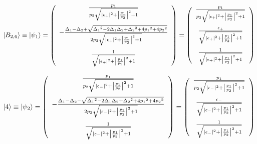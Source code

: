 \begin{equation}
     \ket{B_{2,6}}\equiv\ket{\psi_1}=\left(
        \begin{array}{c}
       \frac{{p_1}}{{p_2}\sqrt{
       |\epsilon_{+}|^2
       +\left|\frac{{p_1}}{{p_2}}\right|^2+1}}\\[20pt]
       -\frac{{\Delta_1}-{\Delta_2}+\sqrt{{\Delta_1}^2-2{\Delta_1}{\Delta_2}+{\Delta_2}^2+4{p_1}^2+4{p_2}^2}}{2{p_2}\sqrt{
       |\epsilon_{+}|^2
       +\left|\frac{{p_1}}{{p_2}}\right|^2+1}}\\[20pt]
       \frac{1}{\sqrt{
       |\epsilon_{+}|^2
       +\left|\frac{{p_1}}{{p_2}}\right|^2+1}}
        \end{array}
        \right)
        =\left(
        \begin{array}{c}
       \frac{{p_1}}{{p_2}\sqrt{
       |\epsilon_{+}|^2
       +\left|\frac{{p_1}}{{p_2}}\right|^2+1}}\\[20pt]
       \frac{\epsilon_+}{
       \sqrt{
       |\epsilon_{+}|^2
       +\left|\frac{{p_1}}{{p_2}}\right|^2+1}}\\[20pt]
       \frac{1}{\sqrt{
       |\epsilon_{+}|^2
       +\left|\frac{{p_1}}{{p_2}}\right|^2+1}}
        \end{array}
        \right)
\end{equation}

\begin{equation}
     \ket{4}\equiv\ket{\psi_2}=\left(
        \begin{array}{c}
       \frac{{p_1}}{{p_2}\sqrt{
       |\epsilon_{-}|^2
       +\left|\frac{{p_1}}{{p_2}}\right|^2+1}}\\[20pt]
       -\frac{{\Delta_1}-{\Delta_2}-\sqrt{{\Delta_1}^2-2{\Delta_1}{\Delta_2}+{\Delta_2}^2+4{p_1}^2+4{p_2}^2}}{2{p_2}\sqrt{
       |\epsilon_{-}|^2
       +\left|\frac{{p_1}}{{p_2}}\right|^2+1}}\\[20pt]
       \frac{1}{\sqrt{
       |\epsilon_{-}|^2
       +\left|\frac{{p_1}}{{p_2}}\right|^2+1}}\\[10pt]
        \end{array}
        \right)
    =\left(
        \begin{array}{c}
       \frac{{p_1}}{{p_2}\sqrt{
       |\epsilon_{-}|^2
       +\left|\frac{{p_1}}{{p_2}}\right|^2+1}}\\[20pt]
       \frac{
       \epsilon_-
       }{\sqrt{
       |\epsilon_{-}|^2
       +\left|\frac{{p_1}}{{p_2}}\right|^2+1}}\\[20pt]
       \frac{1}{\sqrt{
       |\epsilon_{-}|^2
       +\left|\frac{{p_1}}{{p_2}}\right|^2+1}}\\[10pt]
        \end{array}
        \right)
\end{equation}

